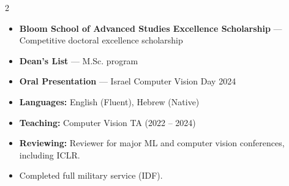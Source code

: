 \documentclass[10pt,a4paper,withhyper]{altacv}
\begin{document}
\begin{paracol}{2}
\begin{itemize}
  \item \textbf{Bloom School of Advanced Studies Excellence Scholarship} --- Competitive doctoral excellence scholarship
  \item \textbf{Dean's List} --- M.Sc. program
  \item \textbf{Oral Presentation} --- Israel Computer Vision Day 2024
\end{itemize}

\begin{itemize}
  \item \textbf{Languages:} English (Fluent), Hebrew (Native)
  \item \textbf{Teaching:} Computer Vision TA (2022 -- 2024)
  \item \textbf{Reviewing:} Reviewer for major ML and computer vision conferences, including ICLR.
  \item Completed full military service (IDF).
\end{itemize}

\end{paracol}
\end{document}
